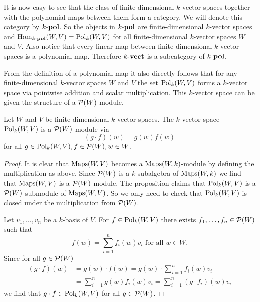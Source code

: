 It is now easy to see that the class of finite-dimensional $k$-vector spaces together with the polynomial maps between them form a category. We will denote this category by $k\text{-}\mathbf{pol}$. So the objects in $k\text{-}\mathbf{pol}$ are finite-dimensional $k$-vector spaces and $\operatorname{Hom}_{k\text{-}\mathbf{pol}}(W,V) = \operatorname{Pol}_k(W,V)$ for all finite-dimensional $k$-vector spaces $W$ and $V$. Also notice that every linear map between finite-dimensional $k$-vector spaces is a polynomial map. Therefore $k\text{-}\mathbf{vect}$ is a subcategory of $k\text{-}\mathbf{pol}$.

From the definition of a polynomial map it also directly follows that for any finite-dimensional $k$-vector spaces $W$ and $V$ the set $\operatorname{Pol}_k(W,V)$ forms a $k$-vector space via pointwise addition and scalar multiplication. This $k$-vector space can be given the structure of a $\mathcal{P}(W)$-module.

\begin{prop}
 Let $W$ and $V$ be finite-dimensional $k$-vector spaces. The $k$-vector space $\operatorname{Pol}_k(W,V)$ is a $\mathcal{P}(W)$-module via
 \[
  (g \cdot f)(w) = g(w) f(w)
 \]
 for all $g \in \operatorname{Pol}_k(W,V), f \in \mathcal{P}(W), w \in W$.
\end{prop}
\begin{proof}
 It is clear that $\operatorname{Maps}(W,V)$ becomes a $\operatorname{Maps}(W,k)$-module by defining the multiplication as above. Since $\mathcal{P}(W)$ is a $k$-subalgebra of $\operatorname{Maps}(W,k)$ we find that $\operatorname{Maps}(W,V)$ is a $\mathcal{P}(W)$-module. The proposition claims that $\operatorname{Pol}_k(W,V)$ is a $\mathcal{P}(W)$-submodule of $\operatorname{Maps}(W,V)$. So we only need to check that $\operatorname{Pol}_k(W,V)$ is closed under the multiplication from $\mathcal{P}(W)$.
 
 Let $v_1, \dotsc, v_n$ be a $k$-basis of $V$. For $f \in \operatorname{Pol}_k(W,V)$ there exists $f_1, \dotsc, f_n \in \mathcal{P}(W)$ such that
 \[
  f(w) = \sum_{i=1}^n f_i(w) v_i \text{ for all } w \in W.
 \]
 Since for all $g \in \mathcal{P}(W)$
 \begin{align*}
  (g \cdot f)(w)
  &= g(w) \cdot f(w)
  = g(w) \cdot \sum_{i=1}^n f_i(w) v_i \\
  &= \sum_{i=1}^n g(w) f_i(w) v_i
  = \sum_{i=1}^n (g \cdot f_i)(w) v_i
 \end{align*}
 we find that $g \cdot f \in \operatorname{Pol}_k(W,V)$ for all $g \in \mathcal{P}(W)$.
\end{proof}



